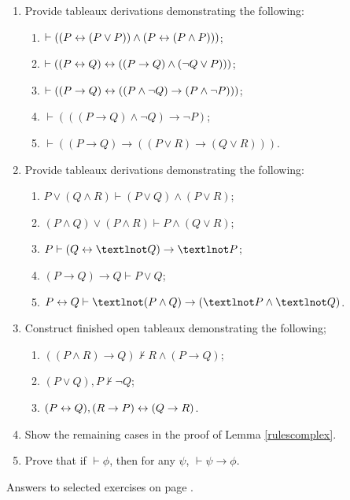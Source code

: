 {\begin{enumerate}
	\item Provide  tableaux derivations demonstrating the following: \begin{enumerate}
		\item $\vdash ((P \leftrightarrow (P \vee P)) \wedge (P \leftrightarrow (P \wedge P)))$;
		\item $\vdash ((P\leftrightarrow Q) \leftrightarrow ((P\to Q) \wedge (\neg Q \vee P)))$;
		\item $\vdash ((P \to Q) \leftrightarrow ((P \wedge \neg Q) \to (P \wedge \neg P)))$;
		\item $\vdash (((P \to Q) \wedge \neg Q) \to \neg P)$;
		\item $\vdash ((P \to Q) \to ((P \vee R) \to (Q \vee R)))$.
	\end{enumerate}
\item Provide  tableaux derivations demonstrating the following: \begin{enumerate}
\item $P \vee (Q \wedge R) \vdash (P \vee Q) \wedge (P \vee R)$;
\item $(P\wedge Q) \vee (P \wedge R) \vdash P\wedge(Q\vee R)$;
\item $P \vdash (Q \bicond ¬Q) \to ¬P$;
\item $(P \to Q) \to Q \vdash P \vee Q$;
\item $P\bicond Q \vdash ¬(P\wedge Q) \to (¬P \wedge ¬Q)$.
\end{enumerate}
\item Construct finished open tableaux demonstrating the following; \begin{enumerate}
	\item $((P \wedge R) \to Q) \nvdash R \wedge (P\to Q)$;
	\item $(P \vee Q), P \nvdash ¬Q$;
	\item $(P \leftrightarrow Q), (R \to P) \leftrightarrow (Q \to R)$.
\end{enumerate}
\item Show the remaining cases in the proof of Lemma \ref{rulescomplex}.
 \item Prove that if $\vdash \phi$, then for any $\psi$, $\vdash \psi\to\phi$.

 \end{enumerate}


Answers to selected exercises on page \pageref{ans:l1tabl}.
}
